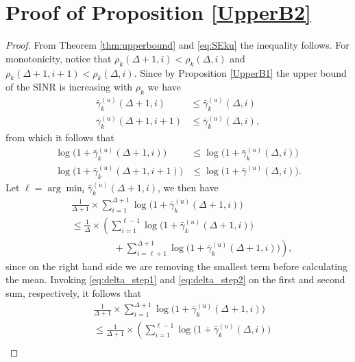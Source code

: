\documentclass[conference, a4paper, 10pt]{IEEEtran}
\begin{document}
\section{Proof of Proposition \ref{UpperB2}}
\label{Sec:P3}
\begin{proof}
From Theorem \ref{thm:upperbound} and \eqref{eq:SEku} the inequality follows.
For monotonicity, notice that $\rho_k(\Delta + 1, i) < \rho_k(\Delta, i )$ and
$\rho_k(\Delta + 1, i + 1) < \rho_k(\Delta, i )$.
Since by Proposition \ref{UpperB1} the upper bound of the \ac{SINR} is increasing with $\rho_k$ we have
\begin{align}
    \bar{\gamma}_k^{(u)}(\Delta + 1,i) &\leq \bar{\gamma}_k^{(u)}(\Delta,i) \nonumber \\
    \bar{\gamma}_k^{(u)}(\Delta + 1,i + 1) &\leq \bar{\gamma}_k^{(u)}(\Delta,i),
\end{align}
from which it follows that
\begin{align}
    \log\big(1 + \bar{\gamma}_k^{(u)}(\Delta + 1,i)\big) &\leq \log\big(1 + \bar{\gamma}_k^{(u)}(\Delta,i)\big)
    \label{eq:delta_step1}\\
    \log\big(1 + \bar{\gamma}_k^{(u)}(\Delta + 1,i + 1)\big) &\leq \log\big(1 + \bar{\gamma}^{(u)}(\Delta,i)\big).
    \label{eq:delta_step2}
\end{align}
Let $\ell = \arg\min_i \bar{\gamma}_k^{(u)}(\Delta + 1,i)$,
we then have
\begin{align}
 \nonumber &  \frac{1}{\Delta+1}  \times \sum_{i=1}^{\Delta+1} \log\big(1 + \bar{\gamma}_k^{(u)}(\Delta + 1,i)\big)
 \\ \nonumber
 & \leq  \frac{1}{\Delta} \times \left( \sum_{i=1}^{\ell-1} \log\big(1 + \bar{\gamma}_k^{(u)}(\Delta + 1,i)\big) \right. \\
    & ~~~~~~~~~~~~~~~~~~~~ + \left. \sum_{i=\ell+1}^{\Delta+1} \log\big(1 + \bar{\gamma}_k^{(u)}(\Delta + 1,i)\big) \right),
\end{align}
since on the right hand side we are removing the smallest term before calculating the mean.
Invoking \eqref{eq:delta_step1} and \eqref{eq:delta_step2} on the first and second sum, respectively, it follows that
\begin{align}
\nonumber
&   \frac{1}{\Delta + 1} \times \sum_{i=1}^{\Delta+1} \log\big(1 + \bar{\gamma}_k^{(u)}(\Delta + 1,i) \big)
\\ \nonumber
&  \leq  \frac{1}{\Delta + 1} \times \left( \sum_{i=1}^{\ell-1} \log\big(1 + \bar{\gamma}_k^{(u)}(\Delta,i)\big) \right. \\ \nonumber

\end{align}
\end{proof}
\end{document}
